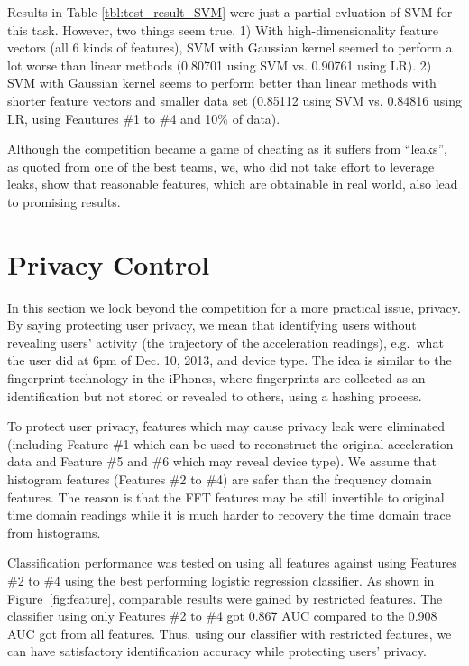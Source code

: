 \documentclass{article} %
\begin{document}
Results in Table \ref{tbl:test_result_SVM} were just a partial evluation of SVM for this task. However, two things seem true. 1) With high-dimensionality feature vectors (all 6 kinds of features), SVM with Gaussian kernel seemed to perform a lot worse than linear methods (0.80701 using SVM vs. 0.90761 using LR). 2) SVM with Gaussian kernel seems to perform better than linear methods with shorter feature vectors and smaller data set (0.85112 using SVM vs. 0.84816 using LR, using Feautures \#1 to \#4 and 10\% of data).

Although the competition became a game of cheating as it suffers from ``leaks'', as quoted from one of the best teams, we, who did not take effort to leverage leaks, show that reasonable features, which are obtainable in real world, also lead to promising results.


\section{Privacy Control}
In this section we look beyond the competition for a more practical issue, privacy. By saying protecting user privacy, we mean that identifying users without revealing users' activity (the trajectory of the acceleration readings), e.g.\ what the user did at 6pm of Dec. 10, 2013, and device type. The idea is similar to the fingerprint technology in the iPhones, where fingerprints are collected as an identification but not stored or revealed to others, using a hashing process.

To protect user privacy, features which may cause privacy leak were eliminated (including Feature \#1 which can be used to reconstruct the original acceleration data and Feature \#5 and \#6 which may reveal device type). We assume that histogram features (Features \#2 to \#4) are safer than the frequency domain features. The reason is that the FFT features may be still invertible to original time domain readings while it is much harder to recovery the time domain trace from histograms.


Classification performance was tested on using all features against using Features \#2 to \#4 using the best performing logistic regression classifier. As shown in Figure~\ref{fig:feature}, comparable results were gained by restricted features. The classifier using only Features \#2 to \#4 got 0.867 AUC compared to the 0.908 AUC got from all features. Thus, using our classifier with restricted features, we can have satisfactory identification accuracy while protecting users' privacy.
\end{document}
